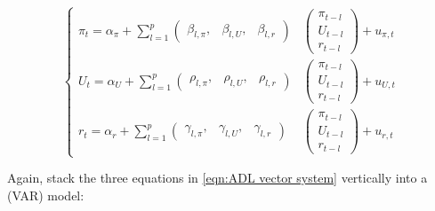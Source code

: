         \begin{equation}
            \begin{cases}
            
            \pi_t = \alpha_\pi + \sum_{l=1}^p \begin{pmatrix}
                \beta_{l,\pi}, & \beta_{l,U}, & \beta_{l,r}
            \end{pmatrix}&
            \begin{pmatrix}
                \pi_{t-l}\\
                U_{t-l}\\
                r_{t-l}
            \end{pmatrix}
            +u_{\pi,t}\\
            
            U_t = \alpha_U + \sum_{l=1}^p \begin{pmatrix}
                \rho_{l,\pi}, & \rho_{l,U}, & \rho_{l,r}
            \end{pmatrix}&
            \begin{pmatrix}
                \pi_{t-l}\\
                U_{t-l}\\
                r_{t-l}
            \end{pmatrix}
            +u_{U,t}\\
            
            r_t = \alpha_r + \sum_{l=1}^p \begin{pmatrix}
                \gamma_{l,\pi}, & \gamma_{l,U}, & \gamma_{l,r}
            \end{pmatrix}&
            \begin{pmatrix}
                \pi_{t-l}\\
                U_{t-l}\\
                r_{t-l}
            \end{pmatrix}
            +u_{r,t}
            \end{cases}
            \label{eqn:ADL vector system}
        \end{equation}

        Again, stack the three equations in \ref{eqn:ADL vector system} vertically into a  (VAR) model:

